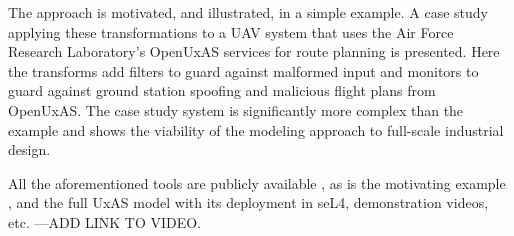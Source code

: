 The approach is motivated, and illustrated, in a simple example. A case study applying these transformations to a UAV system that uses the Air Force Research Laboratory's OpenUxAS services for route planning is presented. Here the transforms add filters to guard against malformed input and monitors to guard against ground station spoofing and malicious flight plans from OpenUxAS. The case study system is significantly more complex than the example and shows the viability of the modeling approach to full-scale industrial design. 

All the aforementioned tools are publicly available \cite{fmide}, as is the motivating example \cite{repo}, and the full UxAS model with its deployment in seL4, demonstration videos, etc. \cite{phase2, camkes} ---ADD LINK TO VIDEO.   

\begin{comment}
The basic process proceeds as follows:
\begin{enumerate}
  \item CakeML provides a mechanism to take a defined logic in HOL4 and turn it into CakeML in a way that exactly preserves the meaning of the logic.
  \item Verified components are created by defining the meaning of the components in HOL4, and then using the existing theories to turn that meaning into CakeML
  \item Contiguity types provide a formalism for defining a language and recognizing membership in a language via a matcher
  \item Contiguity types include dependent types and the ability to define when a type is malformed
  \item Define a contract language that makes assumptions on input and guarantees properties on output
  \item Give meaning to the contract language in terms of traces (not easy to do because of the state)
  \item Show how the contract can be expressed in terms of a step function 
  \item The step-function is lifted to traces
  \item A contract defines a language over traces
  \item A step function recognizes membership in that language (prefix closed)
  \item Follow the same pattern used in contiguity types
  \item The CakeML comes for free once the HOL4 theories are shown
\end{enumerate}



\end{comment}
